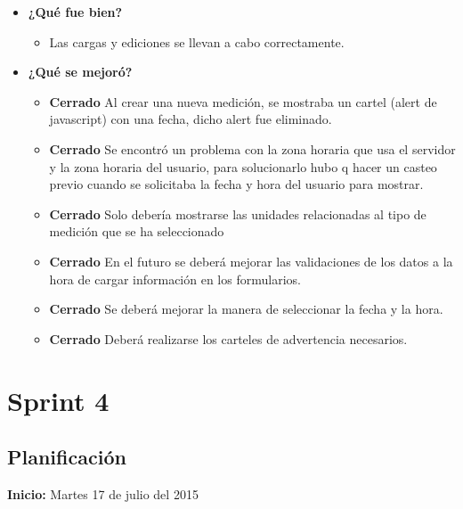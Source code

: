 \documentclass[a4paper,12pt]{article}
\begin{document}
	\begin{itemize}
		\item \textbf{¿Qué fue bien?}
        	\begin{itemize}
				\item        Las cargas y ediciones se llevan a cabo correctamente.
			\end{itemize}

   		\item \textbf{¿Qué se mejoró?}
        	\begin{itemize}
				\item \textbf{Cerrado} Al crear una nueva medición, se mostraba un cartel (alert de javascript) con una fecha, dicho alert fue eliminado.
                \item \textbf{Cerrado} Se encontró un problema con la zona horaria que usa el servidor y la zona horaria del usuario, para solucionarlo hubo q hacer un casteo previo cuando se solicitaba la fecha y hora del usuario para mostrar.
			\end{itemize}

        	\begin{itemize}
		        \item \textbf{Cerrado} Solo debería mostrarse las unidades relacionadas al tipo de medición que se ha seleccionado 
				\item \textbf{Cerrado} En el futuro se deberá mejorar las validaciones de los datos a la hora de cargar información en los formularios.
        		\item \textbf{Cerrado} Se deberá mejorar la manera de seleccionar la fecha y la hora. 
                \item \textbf{Cerrado} Deberá realizarse los carteles de advertencia necesarios.
            \end{itemize}
       
	\end{itemize}
\section{Sprint 4}%
\subsection{Planificación}

\textbf{Inicio: }Martes 17 de julio del 2015 
\end{document}

